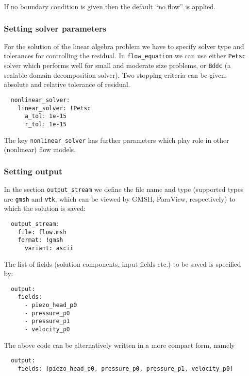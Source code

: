 If no boundary condition is given then the default ``no flow'' is
applied.

\subsubsection{Setting solver parameters}

For the solution of the linear algebra problem we have to specify solver
type and tolerances for controlling the residual. In
\texttt{flow\_equation} we can use either \texttt{Petsc} solver which
performs well for small and moderate size problems, or \texttt{Bddc} (a
scalable domain decomposition solver). Two stopping criteria can be
given: absolute and relative tolerance of residual.

\begin{verbatim}
  nonlinear_solver:
    linear_solver: !Petsc
      a_tol: 1e-15
      r_tol: 1e-15
\end{verbatim}

The key \texttt{nonlinear\_solver} has further parameters which play
role in other (nonlinear) flow models.

\subsubsection{Setting output}

In the section \texttt{output\_stream} we define the file name and type
(supported types are \texttt{gmsh} and \texttt{vtk}, which can be viewed
by GMSH, ParaView, respectively) to which the solution is saved:

\begin{verbatim}
  output_stream:
    file: flow.msh
    format: !gmsh
      variant: ascii
\end{verbatim}

The list of fields (solution components, input fields etc.) to be saved
is specified by:

\begin{verbatim}
  output:
    fields:
      - piezo_head_p0
      - pressure_p0
      - pressure_p1
      - velocity_p0
\end{verbatim}

The above code can be alternatively written in a more compact form,
namely

\begin{verbatim}
  output:
    fields: [piezo_head_p0, pressure_p0, pressure_p1, velocity_p0]
\end{verbatim}

